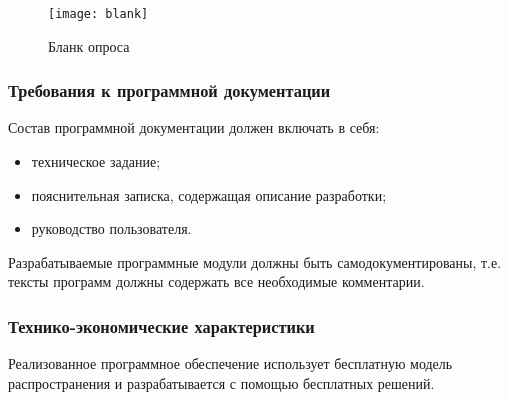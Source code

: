 \begin{figure}[ht]
	\centering
	\vspace{\toppaddingoffigure}
	\texttt{[image: blank]}
	\caption{Бланк опроса}
	\label{f:blank}
\end{figure}



\subsubsection{Требования к программной документации}

Состав программной документации должен включать в себя: 

\begin{itemize}
	\item техническое задание; 
	\item пояснительная записка, содержащая описание разработки;
	\item руководство пользователя.
\end{itemize}

Разрабатываемые программные модули должны быть самодокументированы, т.е. тексты программ должны содержать все необходимые комментарии.

\subsubsection{Технико-экономические характеристики}

Реализованное программное обеспечение использует бесплатную модель распространения и разрабатывается с помощью бесплатных решений.